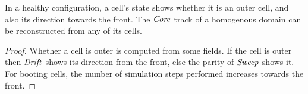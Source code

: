 \documentclass[11pt]{memoir}
\theoremstyle{definition} %
\newcommand{\fld}[1]{\ensuremath{\textit{#1\/}}}
\def\B{B}
\newcommand{\Q}{Q} %
\newcommand{\Core}{\fld{Core}}
\newcommand{\Drift}{\fld{Drift}}
\newcommand{\Sweep}{\fld{Sweep}} %
\begin{document}




\begin{lemma}\label{lem:infer-between}
In a healthy configuration, 
a cell's state shows whether it is an outer cell, and also its direction towards the front.
The \( \Core \) track of a homogenous domain can be reconstructed from any of its cells.
\end{lemma}
\begin{proof}
Whether a cell is outer is computed from some fields.
If the cell is outer then \( \Drift \) shows its direction from the front,
else the parity of \( \Sweep \) shows it.
For booting cells, the number of simulation steps performed increases towards the front.
\end{proof}
\end{document}
